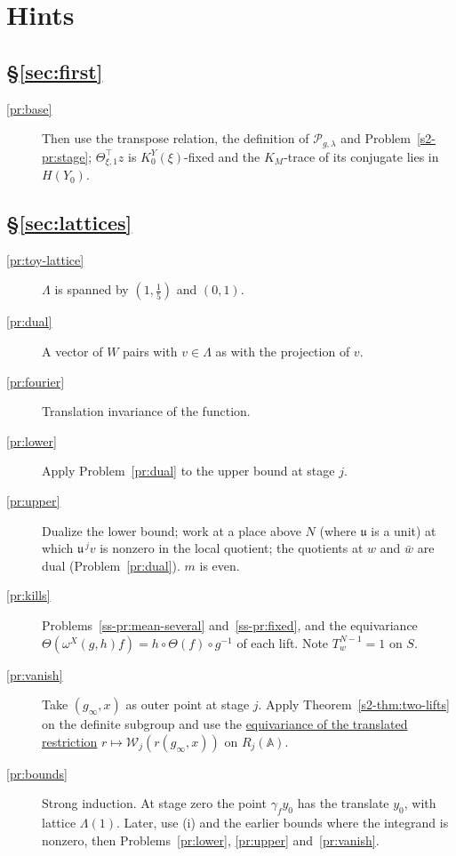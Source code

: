 \documentclass[reqno]{amsart}
\theoremstyle{definition}
\theoremstyle{plain}
\theoremstyle{remark}
\newcommand{\A}{\mathbb{A}}
\newcommand{\Pc}{\mathcal{P}}
\newcommand{\Wc}{\mathcal{W}}
\newcommand{\uu}{\mathfrak{u}}
\newcommand{\KY}[1]{K^{Y}_{#1}(\xi)}
\newcommand{\gls}[3]{\href{https://github.com/lsernau/grh-lean/blob/72fead1/grh/src/#1.lean\#L#2}{#3}}
\newcommand{\glu}[3]{\gls{New/UpperBound/#1}{#2}{#3}}
\begin{document}
\section*{Hints}

\subsection*{\S\ref{sec:first}}
\begin{description}
\item[\ref{pr:base}] Then use the transpose relation, the definition of \(\Pc_{g,\lambda}\) and Problem~\ref{s2-pr:stage}; \(\Theta^\top_{\xi,1}z\) is \(\KY0\)-fixed and the \(K_M\)-trace of its conjugate lies in \(H(Y_0)\).
\end{description}

\subsection*{\S\ref{sec:lattices}}
\begin{description}
\item[\ref{pr:toy-lattice}] \(\Lambda\) is spanned by \((1,\tfrac15)\) and \((0,1)\).
\item[\ref{pr:dual}] A vector of \(W\) pairs with \(v\in\Lambda\) as with the projection of \(v\).
\item[\ref{pr:fourier}] Translation invariance of the function.
\item[\ref{pr:lower}] Apply Problem~\ref{pr:dual} to the upper bound at stage \(j\).
\item[\ref{pr:upper}] Dualize the lower bound; work at a place above \(N\) (where \(\uu\) is a unit) at which \(\uu^{\,j}v\) is nonzero in the local quotient; the quotients at \(w\) and \(\bar w\) are dual (Problem~\ref{pr:dual}).  \(m\) is even.
\item[\ref{pr:kills}] Problems~\ref{ss-pr:mean-several} and~\ref{ss-pr:fixed}, and the equivariance \(\Theta(\omega^X(g,h)f)=h\circ\Theta(f)\circ g^{-1}\) of each lift.  Note \(T_w^{N-1}=1\) on \(S\).
\item[\ref{pr:vanish}] Take \((g_\infty,x)\) as outer point at stage \(j\).  Apply Theorem~\ref{s2-thm:two-lifts} on the definite subgroup and use the \glu{Seesaw/UnfoldingStages}{657}{equivariance of the translated restriction} \(r\mapsto\Wc_j(r(g_\infty,x))\) on \(R_j(\A)\).
\item[\ref{pr:bounds}] Strong induction.  At stage zero the point \(\gamma_fy_0\) has the translate \(y_0\), with lattice \(\Lambda(1)\).  Later, use (i) and the earlier bounds where the integrand is nonzero, then Problems~\ref{pr:lower}, \ref{pr:upper} and~\ref{pr:vanish}.
\end{description}
\end{document}

